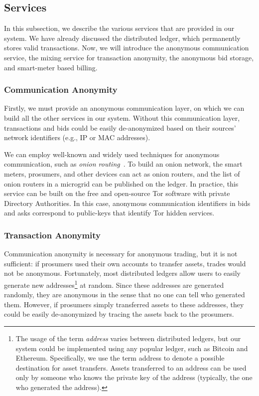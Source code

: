 \subsection{Services}

In this subsection, we describe the various services that are provided in our system. %
We have already discussed the distributed ledger, which permanently stores valid transactions.
Now, we will introduce the anonymous communication service, the mixing service for transaction anonymity, the anonymous bid storage, and smart-meter based billing.

\subsubsection{Communication Anonymity}
Firstly, we must provide an anonymous communication layer, on which we can build all the other services in our system.
Without this communication layer, transactions and bids could be easily de-anonymized based on their sources' network identifiers (e.g., IP or MAC addresses).

We can employ well-known and widely used techniques for anonymous communication, such as \emph{onion routing}~\cite{reed1998anonymous}.
To build an onion network, the smart meters, prosumers, and other devices can act as onion routers, and the list of onion routers in a microgrid can be published on the ledger.
In practice, this service can be built on 
 the free and open-source Tor software with private Directory Authorities.
In this case, anonymous communication identifiers in bids and asks correspond to public-keys that identify Tor hidden services.

\subsubsection{Transaction Anonymity}
Communication anonymity is necessary for anonymous trading, but it is not sufficient: if prosumers used their own accounts to transfer assets, trades would not be anonymous.
Fortunately, most distributed ledgers allow users to easily generate new addresses\footnote{The usage of the term \emph{address} varies between distributed ledgers, but our system could be implemented using any popular ledger, such as Bitcoin and Ethereum. 
Specifically, we use the term address to denote a possible destination for asset transfers. 
Assets transferred to an address can be used only by someone who knows the private key of the address (typically, the one who generated the address).} 
at random.
Since these addresses are generated randomly, they are anonymous in the sense that no one can tell who generated them.
However, if prosumers simply transferred assets to these addresses, they could be easily de-anonymized by tracing the assets back to the prosumers.

